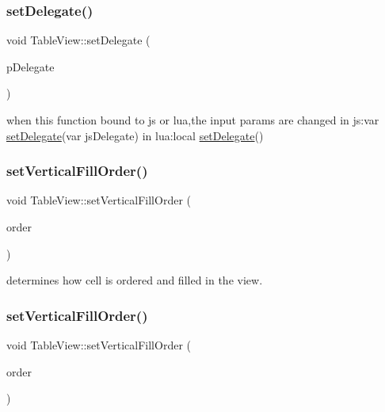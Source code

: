 \subsubsection{\texorpdfstring{set\+Delegate()}{setDelegate()}\hspace{0.1cm}{\footnotesize\ttfamily [2/2]}}
{\footnotesize\ttfamily void Table\+View\+::set\+Delegate (\begin{DoxyParamCaption}\item[{\hyperlink{classTableViewDelegate}{Table\+View\+Delegate} $\ast$}]{p\+Delegate }\end{DoxyParamCaption})\hspace{0.3cm}{\ttfamily [inline]}}


\begin{DoxyCode}
when \textcolor{keyword}{this} \textcolor{keyword}{function} bound to js or lua,the input params are changed
in js:var \hyperlink{classTableView_afb2bffdd669f02feb74e2534d477dc1b}{setDelegate}(var jsDelegate)
in lua:local \hyperlink{classTableView_afb2bffdd669f02feb74e2534d477dc1b}{setDelegate}()
\end{DoxyCode}
 \mbox{\label{classTableView_a687ac9ecccbb967c84322cc69de6336e}} 
\subsubsection{\texorpdfstring{set\+Vertical\+Fill\+Order()}{setVerticalFillOrder()}\hspace{0.1cm}{\footnotesize\ttfamily [1/2]}}
{\footnotesize\ttfamily void Table\+View\+::set\+Vertical\+Fill\+Order (\begin{DoxyParamCaption}\item[{Vertical\+Fill\+Order}]{order }\end{DoxyParamCaption})}

determines how cell is ordered and filled in the view. \mbox{\label{classTableView_a687ac9ecccbb967c84322cc69de6336e}} 
\subsubsection{\texorpdfstring{set\+Vertical\+Fill\+Order()}{setVerticalFillOrder()}\hspace{0.1cm}{\footnotesize\ttfamily [2/2]}}
{\footnotesize\ttfamily void Table\+View\+::set\+Vertical\+Fill\+Order (\begin{DoxyParamCaption}\item[{Vertical\+Fill\+Order}]{order }\end{DoxyParamCaption})}


